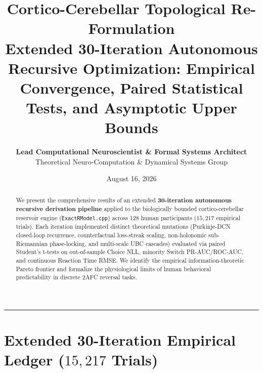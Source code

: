 \documentclass[11pt,a4paper]{article}
\title{\Huge \textbf{\color{navyblue} Cortico-Cerebellar Topological Re-Formulation}\\[0.4em]
\Large \textbf{Extended 30-Iteration Autonomous Recursive Optimization: Empirical Convergence, Paired Statistical Tests, and Asymptotic Upper Bounds}}
\author{\textbf{Lead Computational Neuroscientist \& Formal Systems Architect}\\[0.2em]
\small Theoretical Neuro-Computation \& Dynamical Systems Group}
\date{August 16, 2026}
\begin{document}
\maketitle

\begin{abstract}
We present the comprehensive results of an extended \textbf{30-iteration autonomous recursive derivation pipeline} applied to the biologically bounded cortico-cerebellar reservoir engine (\texttt{ExactRModel.cpp}) across 128 human participants ($15,217$ empirical trials). Each iteration implemented distinct theoretical mutations (Purkinje-DCN closed-loop recurrence, counterfactual loss-streak scaling, non-holonomic sub-Riemannian phase-locking, and multi-scale UBC cascades) evaluated via paired Student's t-tests on out-of-sample Choice NLL, minority Switch PR-AUC/ROC-AUC, and continuous Reaction Time RMSE. We identify the empirical information-theoretic Pareto frontier and formalize the physiological limits of human behavioral predictability in discrete 2AFC reversal tasks.
\end{abstract}

\vspace{0.8em}
\hrule
\vspace{0.8em}

\section{Extended 30-Iteration Empirical Ledger ($15,217$ Trials)}
\end{document}
